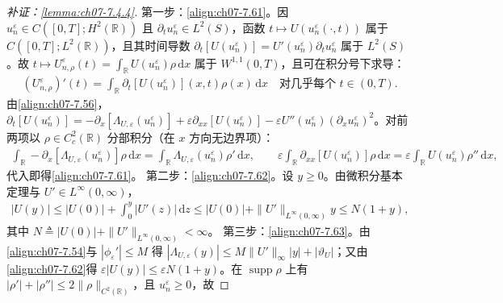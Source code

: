 ﻿\documentclass[../../main.tex]{subfiles}%
\begin{document}
\begin{proof}[补证：\cref{lemma:ch07-7.4.4}]
第一步：\eqref{align:ch07-7.61}。因 $u_n^\varepsilon\in C([0,T];H^2(\mathbb{R}))$ 且 $\partial_tu_n^\varepsilon\in L^2(S)$，函数 $t\mapsto U(u_n^\varepsilon(\cdot,t))$ 属于 $C([0,T];L^2(\mathbb{R}))$，且其时间导数 $\partial_t[U(u_n^\varepsilon)]=U'(u_n^\varepsilon)\partial_tu_n^\varepsilon$ 属于 $L^2(S)$。故 $t\mapsto U_{n,\rho}^\varepsilon(t)=\int_{\mathbb{R}}U(u_n^\varepsilon)\rho\,\mathrm{d}x$ 属于 $W^{1,1}(0,T)$，且可在积分号下求导：
\begin{align*}
(U_{n,\rho}^\varepsilon)'(t)=\int_{\mathbb{R}}\partial_t[U(u_n^\varepsilon)](x,t)\rho(x)\,\mathrm{d}x\quad\text{对几乎每个 }t\in(0,T).
\end{align*}
由\eqref{align:ch07-7.56}，$\partial_t[U(u_n^\varepsilon)]=-\partial_x[\Lambda_{U,\varepsilon}(u_n^\varepsilon)]+\varepsilon\partial_{xx}[U(u_n^\varepsilon)]-\varepsilon U''(u_n^\varepsilon)(\partial_xu_n^\varepsilon)^2$。对前两项以 $\rho\in C^2_c(\mathbb{R})$ 分部积分（在 $x$ 方向无边界项）：
\begin{align*}
\int_{\mathbb{R}}-\partial_x[\Lambda_{U,\varepsilon}(u_n^\varepsilon)]\rho\,\mathrm{d}x=\int_{\mathbb{R}}\Lambda_{U,\varepsilon}(u_n^\varepsilon)\rho'\,\mathrm{d}x,\qquad
\varepsilon\int_{\mathbb{R}}\partial_{xx}[U(u_n^\varepsilon)]\rho\,\mathrm{d}x=\varepsilon\int_{\mathbb{R}}U(u_n^\varepsilon)\rho''\,\mathrm{d}x,
\end{align*}
代入即得\eqref{align:ch07-7.61}。
第二步：\eqref{align:ch07-7.62}。设 $y\geqslant0$。由微积分基本定理与 $U'\in L^\infty(0,\infty)$，
\begin{align*}
|U(y)|\leqslant|U(0)|+\int_0^y|U'(z)|\,\mathrm{d}z\leqslant|U(0)|+\|U'\|_{L^\infty(0,\infty)}y\leqslant N(1+y),
\end{align*}
其中 $N\triangleq|U(0)|+\|U'\|_{L^\infty(0,\infty)}<\infty$。
第三步：\eqref{align:ch07-7.63}。由\eqref{align:ch07-7.54}与 $|\phi_\varepsilon'|\leqslant M$ 得 $|\Lambda_{U,\varepsilon}(y)|\leqslant M\|U'\|_\infty|y|+|\vartheta_U|$；又由\eqref{align:ch07-7.62}得 $\varepsilon|U(y)|\leqslant\varepsilon N(1+y)$。在 $\operatorname{supp}\rho$ 上有 $|\rho'|+|\rho''|\leqslant2\|\rho\|_{C^2(\mathbb{R})}$，且 $u_n^\varepsilon\geqslant0$，故

\end{proof}
\end{document}

